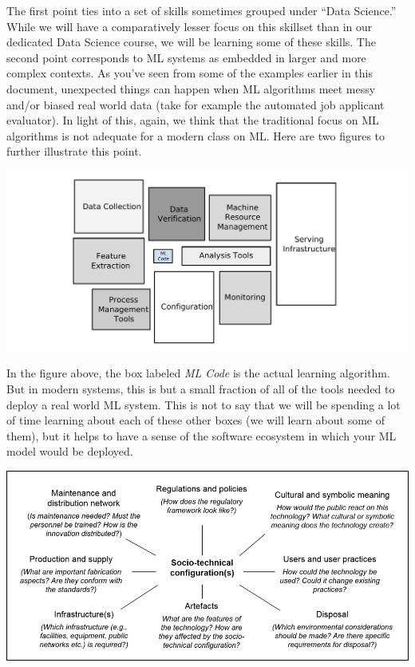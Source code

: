 \documentclass[assignment01_Solutions]{subfiles}
\begin{document}
The first point ties into a set of skills sometimes grouped under ``Data Science.''  While we will have a comparatively lesser focus on this skillset than in our dedicated Data Science course, we will be learning some of these skills.  The second point corresponds to ML systems as embedded in larger and more complex contexts.  As you've seen from some of the examples earlier in this document, unexpected things can happen when ML algorithms meet messy and/or biased real world data (take for example the automated job applicant evaluator).  In light of this, again, we think that the traditional focus on ML algorithms is not adequate for a modern class on ML.  Here are two figures to further illustrate this point.


\begin{center}
\includegraphics[width=.6\linewidth]{figures/MlSystem}
\end{center}
In the figure above, the box labeled \emph{ML Code} is the actual learning algorithm.  But in modern systems, this is but a small fraction of all of the tools needed to deploy a real world ML system.  This is not to say that we will be spending a lot of time learning about each of these other boxes (we will learn about some of them), but it helps to have a sense of the software ecosystem in which your ML model would be deployed.

\begin{center}
\includegraphics[width=\linewidth]{figures/sociotechnical}
\end{center}
\end{document}
